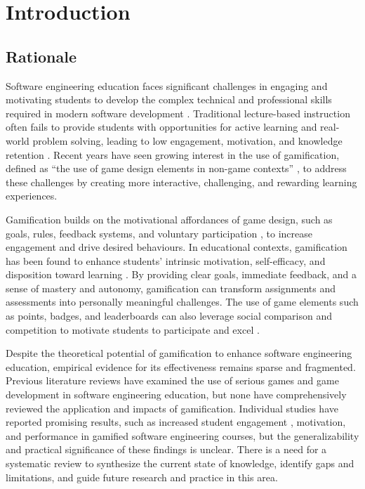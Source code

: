 \documentclass[
	hf,
	]{ceurart}
\begin{document}
		
		
		
		\section{Introduction}
		
		\subsection{Rationale}
		
		Software engineering education faces significant challenges in engaging and motivating students to develop the complex technical and professional skills required in modern software development \citep{Souza2018201}. Traditional lecture-based instruction often fails to provide students with opportunities for active learning and real-world problem solving, leading to low engagement, motivation, and knowledge retention \citep{Striuk_2022}. Recent years have seen growing interest in the use of gamification, defined as ``the use of game design elements in non-game contexts'' \citep[p.~1]{DetelingRiedl2015}, to address these challenges by creating more interactive, challenging, and rewarding learning experiences. 
		
		Gamification builds on the motivational affordances of game design, such as goals, rules, feedback systems, and voluntary participation \citep{Polat_2023}, to increase engagement and drive desired behaviours. In educational contexts, gamification has been found to enhance students' intrinsic motivation, self-efficacy, and disposition toward learning \citep{10.1145/3555858.3555912, SEABORN201514}. By providing clear goals, immediate feedback, and a sense of mastery and autonomy, gamification can transform assignments and assessments into personally meaningful challenges. The use of game elements such as points, badges, and leaderboards can also leverage social comparison and competition to motivate students to participate and excel \citep{encyclopedia3040089}.
		
		Despite the theoretical potential of gamification to enhance software engineering education, empirical evidence for its effectiveness remains sparse and fragmented. Previous literature reviews have examined the use of serious games \citep{CALDERON201836, 10.1007/978-3-030-00623-5_11} and game development \citep{10.1007/978-3-030-92182-8_26} in software engineering education, but none have comprehensively reviewed the application and impacts of gamification. Individual studies have reported promising results, such as increased student engagement \citep{Akpolat2014149}, motivation, and performance \citep{Berkling2013} in gamified software engineering courses, but the generalizability and practical significance of these findings is unclear. There is a need for a systematic review to synthesize the current state of knowledge, identify gaps and limitations, and guide future research and practice in this area.
		
\end{document}
